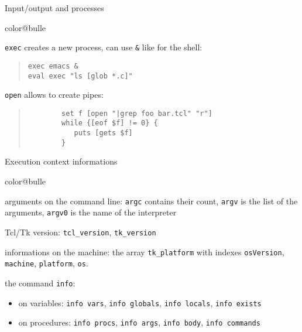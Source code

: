 \documentclass[a4paper,landscape,smooth]{show}
\begin{document}

\begin{tslide}{Input/output and processes}
   \vfill
   \begin{bitemize}{color@bulle}
   \item \texttt{exec} creates a new process, can use
      \texttt{\&} like for the shell:
      \begin{quote}
	 \texttt{exec emacs \&}\\
	 \texttt{eval exec "ls [glob *.c]"}
      \end{quote}

   \item \texttt{open} allows to create pipes:
      \begin{quote}
	 \begin{verbatim}
	    set f [open "|grep foo bar.tcl" "r"]
	    while {[eof $f] != 0} {
	       puts [gets $f]
	    }
	 \end{verbatim}
      \end{quote}
   \end{bitemize}
   \vfill
\end{tslide}


\begin{tslide}{Execution  context informations}
   \vfill
   \begin{bitemize}{color@bulle}
      \item arguments on the command  line: \texttt{argc} contains their
	 count, \texttt{argv} is the list of the arguments, \texttt{argv0}
         is the name of the interpreter
      \item Tcl/Tk version: \texttt{tcl\_version}, \texttt{tk\_version}
      \item informations on the machine: the array \texttt{tk\_platform}
	 with indexes \texttt{osVersion}, \texttt{machine},
	 \texttt{platform}, \texttt{os}.

      \item the command \texttt{info}:
	 \begin{itemize}
	    \item on variables: \texttt{info vars},
	    \texttt{info globals}, \texttt{info locals},
	    \texttt{info exists}

	    \item on procedures: \texttt{info procs}, \texttt{info args},
	    \texttt{info body}, \texttt{info commands}
         \end{itemize}
   \end{bitemize}
   \vfill
\end{tslide}
\end{document}
